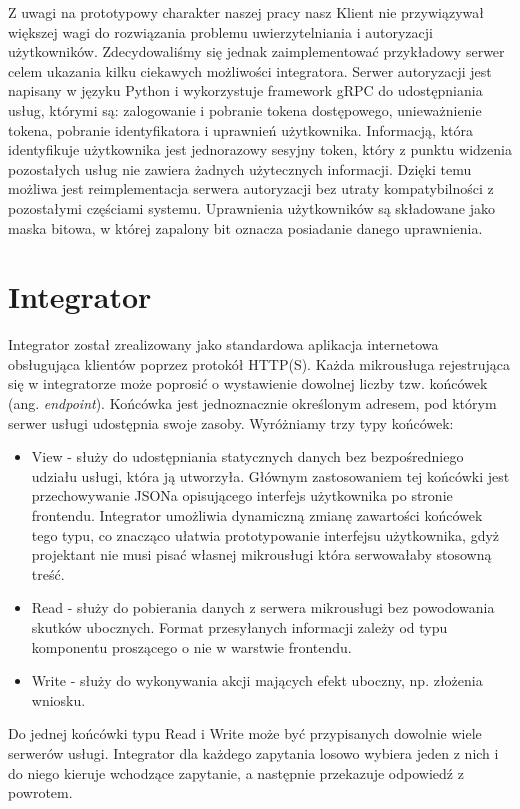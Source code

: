 \documentclass[licencjacka]{pracamgr}
\begin{document}
Z uwagi na prototypowy charakter naszej pracy nasz Klient nie przywiązywał większej
wagi do rozwiązania problemu uwierzytelniania i autoryzacji użytkowników. Zdecydowaliśmy
się jednak zaimplementować przykładowy serwer celem ukazania kilku ciekawych
możliwości integratora. Serwer autoryzacji jest napisany w języku Python i wykorzystuje
framework gRPC do udostępniania usług, którymi są: zalogowanie i pobranie tokena
dostępowego, unieważnienie tokena, pobranie identyfikatora i uprawnień użytkownika.
Informacją, która identyfikuje użytkownika jest jednorazowy sesyjny token, który
z punktu widzenia pozostałych usług nie zawiera żadnych użytecznych informacji.
Dzięki temu możliwa jest reimplementacja serwera autoryzacji bez utraty kompatybilności
z pozostałymi częściami systemu. Uprawnienia użytkowników są składowane jako maska
bitowa, w której zapalony bit oznacza posiadanie danego uprawnienia.

\section{Integrator}

Integrator został zrealizowany jako standardowa aplikacja internetowa obsługująca
klientów poprzez protokół HTTP(S). Każda mikrousługa rejestrująca się w integratorze
może poprosić o wystawienie dowolnej liczby tzw. końcówek (ang. \textit{endpoint}).
Końcówka jest jednoznacznie określonym adresem, pod którym serwer usługi udostępnia
swoje zasoby. Wyróżniamy trzy typy końcówek:
\begin{itemize}
	\item View - służy do udostępniania statycznych danych bez bezpośredniego
	udziału usługi, która ją utworzyła. Głównym zastosowaniem tej końcówki jest
	przechowywanie JSONa opisującego interfejs użytkownika po stronie frontendu.
	Integrator umożliwia dynamiczną zmianę zawartości końcówek tego typu, co znacząco
	ułatwia prototypowanie interfejsu użytkownika, gdyż projektant nie musi pisać
	własnej mikrousługi która serwowałaby stosowną treść.
	\item Read - służy do pobierania danych z serwera mikrousługi bez powodowania
	skutków ubocznych. Format przesyłanych informacji zależy od typu komponentu
	proszącego o nie w warstwie frontendu.
	\item Write - służy do wykonywania akcji mających efekt uboczny, np. złożenia
	wniosku.
\end{itemize}
Do jednej końcówki typu Read i Write może być przypisanych dowolnie wiele serwerów
usługi. Integrator dla każdego zapytania losowo wybiera jeden z nich i do niego
kieruje wchodzące zapytanie, a następnie przekazuje odpowiedź z powrotem.
\end{document}
